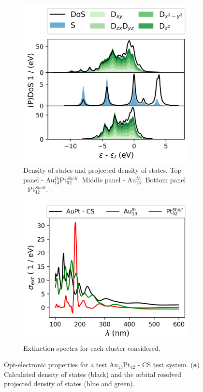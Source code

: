 \begin{figure}
\centering
    \begin{subfigure}{0.45\textwidth}
        \includegraphics[width=\textwidth]{figures/LM/Atomistic/AuPt_CS_DoS.png}
        \caption{Density of states and projected density of states. Top panel - Au$_{13}^{Ih}$Pt$_{32}^{Shell}$. Middle panel - Au$_{13}^{Ih}$. Bottom panel - Pt$_{42}^{Shell}$.}
        \label{fig:CS_DoS}
    \end{subfigure}
    \begin{subfigure}{0.45\textwidth}
        \includegraphics[width=\textwidth]{figures/LM/Atomistic/CS_CSV.png}
        \caption{Extinction spectra for each cluster considered.}
        \label{fig:CS_CSV}
    \end{subfigure}
    \caption{Opt-electronic properties for a test Au$_{13}$Pt$_{42}$ - CS test system. (\textbf{a}) Calculated density of states (black) and the orbital resolved projected density of states (blue and green).}
    \label{fig:DFT_CS}
\end{figure}

